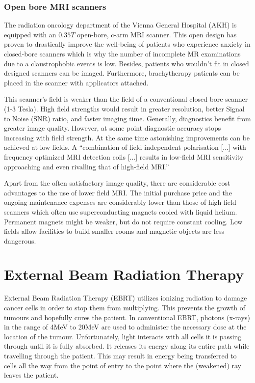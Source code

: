 \subsubsection{Open bore MRI scanners}
The radiation oncology department of the Vienna General Hospital (AKH) is equipped with an $0.35  T$ open-bore, c-arm MRI scanner.
This open design has proven to drastically improve the well-being of patients who experience anxiety in closed-bore scanners which is why the number of incomplete MR examinations due to a claustrophobic events is low. \cite{Enders2011a, Bangard2007}
Besides, patients who wouldn't fit in closed designed scanners can be imaged.
Furthermore, brachytherapy patients can be placed in the scanner with applicators attached.

This scanner's field is weaker than the field of a conventional closed bore scanner (1-3 Tesla).
High field strengths would result in greater resolution, better Signal to Noise (SNR) ratio, and faster imaging time.
Generally, diagnostics benefit from greater image quality.
However, at some point diagnostic accuracy stops increasing with field strength.
At the same time astonishing improvements can be achieved at low fields.
A ``combination of field independent polarisation [...] with frequency optimized MRI detection coils [...] results in low-field MRI sensitivity approaching and even rivalling that of high-field MRI.'' \cite{Coffey2013}

Apart from the often satisfactory image quality, there are considerable cost advantages to the use of lower field MRI.
The initial purchase price and the ongoing maintenance expenses are considerably lower than those of high field scanners which often use superconducting magnets cooled with liquid helium. \cite{Rutt1996}
Permanent magnets might be weaker, but do not require constant cooling.
Low fields allow facilities to build smaller rooms and magnetic objects are less dangerous.



\section{External Beam Radiation Therapy}
\label{sec:planning}
External Beam Radiation Therapy (EBRT) utilizes ionizing radiation to damage cancer cells in order to stop them from multiplying.
This prevents the growth of tumours and hopefully cures the patient. 
In conventional EBRT, photons (x-rays) in the range of 4MeV to 20MeV are used to administer the necessary dose at the location of the tumour.
Unfortunately, light interacts with all cells it is passing through until it is fully absorbed.
It releases its energy along its entire path while travelling through the patient.
This may result in energy being transferred to cells all the way from the point of entry to the point where the (weakened) ray leaves the patient.

